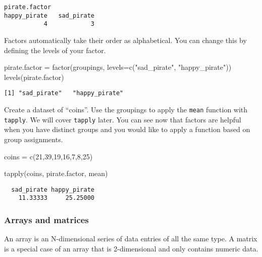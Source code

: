 \documentclass[
  letterpaper,
  DIV=11,
  numbers=noendperiod]{scrartcl}
\newenvironment{Shaded}{\begin{snugshade}}{\end{snugshade}}
\newcommand{\AttributeTok}[1]{\textcolor[rgb]{0.40,0.45,0.13}{#1}}
\newcommand{\DecValTok}[1]{\textcolor[rgb]{0.68,0.00,0.00}{#1}}
\newcommand{\FunctionTok}[1]{\textcolor[rgb]{0.28,0.35,0.67}{#1}}
\newcommand{\NormalTok}[1]{\textcolor[rgb]{0.00,0.23,0.31}{#1}}
\newcommand{\OtherTok}[1]{\textcolor[rgb]{0.00,0.23,0.31}{#1}}
\newcommand{\StringTok}[1]{\textcolor[rgb]{0.13,0.47,0.30}{#1}}
\begin{document}
\begin{verbatim}
pirate.factor
happy_pirate   sad_pirate 
           4            3 
\end{verbatim}

Factors automatically take their order as alphabetical. You can change
this by defining the levels of your factor.

\begin{Shaded}
\begin{Highlighting}[]
\NormalTok{pirate.factor }\OtherTok{=} \FunctionTok{factor}\NormalTok{(groupings, }\AttributeTok{levels=}\FunctionTok{c}\NormalTok{(}\StringTok{"sad\_pirate"}\NormalTok{, }\StringTok{"happy\_pirate"}\NormalTok{))}
\FunctionTok{levels}\NormalTok{(pirate.factor)}
\end{Highlighting}
\end{Shaded}

\begin{verbatim}
[1] "sad_pirate"   "happy_pirate"
\end{verbatim}

Create a dataset of ``coins''. Use the groupings to apply the
\texttt{mean} function with \texttt{tapply}. We will cover
\texttt{tapply} later. You can see now that factors are helpful when you
have distinct groups and you would like to apply a function based on
group assignments.

\begin{Shaded}
\begin{Highlighting}[]
\NormalTok{coins }\OtherTok{=} \FunctionTok{c}\NormalTok{(}\DecValTok{21}\NormalTok{,}\DecValTok{39}\NormalTok{,}\DecValTok{19}\NormalTok{,}\DecValTok{16}\NormalTok{,}\DecValTok{7}\NormalTok{,}\DecValTok{8}\NormalTok{,}\DecValTok{25}\NormalTok{)}

\FunctionTok{tapply}\NormalTok{(coins, pirate.factor, mean)}
\end{Highlighting}
\end{Shaded}

\begin{verbatim}
  sad_pirate happy_pirate 
    11.33333     25.25000 
\end{verbatim}

\subsubsection{Arrays and matrices}\label{arrays-and-matrices}

An array is an N-dimensional series of data entries of all the same
type. A matrix is a special case of an array that is 2-dimensional and
only contains numeric data.
\end{document}
